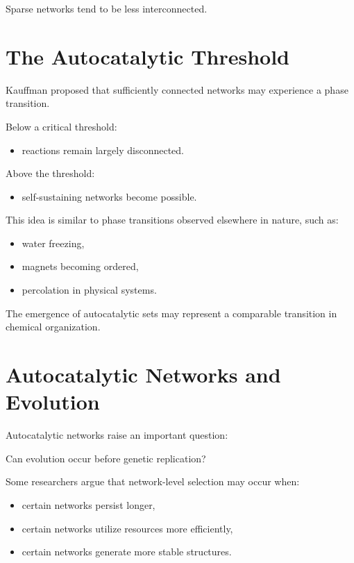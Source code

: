 \documentclass[
  oneside,
  openany]{book}
\providecommand{\tightlist}{%
  \setlength{\itemsep}{0pt}\setlength{\parskip}{0pt}}
\begin{document}
Sparse networks tend to be less interconnected.

\section{The Autocatalytic Threshold}\label{the-autocatalytic-threshold}

Kauffman proposed that sufficiently connected networks may experience a phase transition.

Below a critical threshold:

\begin{itemize}
\tightlist
\item
  reactions remain largely disconnected.
\end{itemize}

Above the threshold:

\begin{itemize}
\tightlist
\item
  self-sustaining networks become possible.
\end{itemize}

This idea is similar to phase transitions observed elsewhere in nature, such as:

\begin{itemize}
\tightlist
\item
  water freezing,
\item
  magnets becoming ordered,
\item
  percolation in physical systems.
\end{itemize}

The emergence of autocatalytic sets may represent a comparable transition in chemical organization.

\section{Autocatalytic Networks and Evolution}\label{autocatalytic-networks-and-evolution}

Autocatalytic networks raise an important question:

Can evolution occur before genetic replication?

Some researchers argue that network-level selection may occur when:

\begin{itemize}
\tightlist
\item
  certain networks persist longer,
\item
  certain networks utilize resources more efficiently,
\item
  certain networks generate more stable structures.
\end{itemize}
\end{document}
